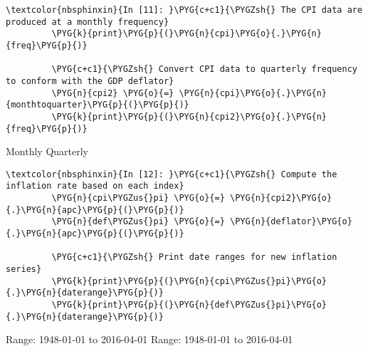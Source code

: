 \documentclass[letterpaper,10pt,openany,oneside,english]{sphinxmanual}
\begin{document}
\noindent{}

\begin{Verbatim}[commandchars=\\\{\}]
\textcolor{nbsphinxin}{In [11]: }\PYG{c+c1}{\PYGZsh{} The CPI data are produced at a monthly frequency}
         \PYG{k}{print}\PYG{p}{(}\PYG{n}{cpi}\PYG{o}{.}\PYG{n}{freq}\PYG{p}{)}
         
         \PYG{c+c1}{\PYGZsh{} Convert CPI data to quarterly frequency to conform with the GDP deflator}
         \PYG{n}{cpi2} \PYG{o}{=} \PYG{n}{cpi}\PYG{o}{.}\PYG{n}{monthtoquarter}\PYG{p}{(}\PYG{p}{)}
         \PYG{k}{print}\PYG{p}{(}\PYG{n}{cpi2}\PYG{o}{.}\PYG{n}{freq}\PYG{p}{)}
\end{Verbatim}
\begin{OriginalVerbatim}[commandchars=\\\{\}]
Monthly
Quarterly
\end{OriginalVerbatim}
\begin{Verbatim}[commandchars=\\\{\}]
\textcolor{nbsphinxin}{In [12]: }\PYG{c+c1}{\PYGZsh{} Compute the inflation rate based on each index}
         \PYG{n}{cpi\PYGZus{}pi} \PYG{o}{=} \PYG{n}{cpi2}\PYG{o}{.}\PYG{n}{apc}\PYG{p}{(}\PYG{p}{)}
         \PYG{n}{def\PYGZus{}pi} \PYG{o}{=} \PYG{n}{deflator}\PYG{o}{.}\PYG{n}{apc}\PYG{p}{(}\PYG{p}{)}
         
         \PYG{c+c1}{\PYGZsh{} Print date ranges for new inflation series}
         \PYG{k}{print}\PYG{p}{(}\PYG{n}{cpi\PYGZus{}pi}\PYG{o}{.}\PYG{n}{daterange}\PYG{p}{)}
         \PYG{k}{print}\PYG{p}{(}\PYG{n}{def\PYGZus{}pi}\PYG{o}{.}\PYG{n}{daterange}\PYG{p}{)}
\end{Verbatim}
\begin{OriginalVerbatim}[commandchars=\\\{\}]
Range: 1948-01-01 to 2016-04-01
Range: 1948-01-01 to 2016-04-01
\end{OriginalVerbatim}
\end{document}
